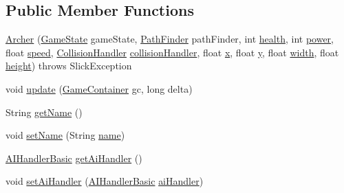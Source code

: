 \subsection*{Public Member Functions}
\begin{DoxyCompactItemize}
\item 
\mbox{\hyperlink{classentities_1_1_archer_a8f0807d8378f9f336f047ff9407df873}{Archer}} (\mbox{\hyperlink{classstates_1_1_game_state}{Game\+State}} game\+State, \mbox{\hyperlink{classentities_1_1_path_finder}{Path\+Finder}} path\+Finder, int \mbox{\hyperlink{classentities_1_1_subject_a8285660fdae3f0b220bbc686cf5c012c}{health}}, int \mbox{\hyperlink{classentities_1_1_subject_a7bd41d6fe9656de66d4a08c4a9565ec4}{power}}, float \mbox{\hyperlink{classentities_1_1_mobile_entity_a815a9d2b23a0bb7e3ee7739d4c10d7c3}{speed}}, \mbox{\hyperlink{classentities_1_1_collision_handler}{Collision\+Handler}} \mbox{\hyperlink{classentities_1_1_mobile_entity_a29fbe797671b1fc81eafe1e48fdc46f9}{collision\+Handler}}, float \mbox{\hyperlink{classorg_1_1newdawn_1_1slick_1_1geom_1_1_shape_a3e985bfff386c15a4efaad03d8ad60d3}{x}}, float \mbox{\hyperlink{classorg_1_1newdawn_1_1slick_1_1geom_1_1_shape_a9f934baded6a1b65ebb69e7e5f80ea00}{y}}, float \mbox{\hyperlink{classorg_1_1newdawn_1_1slick_1_1geom_1_1_rectangle_a967e1823f62daf45abb142779d1be62d}{width}}, float \mbox{\hyperlink{classorg_1_1newdawn_1_1slick_1_1geom_1_1_rectangle_a3bd010fdce636fc11ed0e0ad4d4b4a0a}{height}})  throws Slick\+Exception 
\item 
void \mbox{\hyperlink{classentities_1_1_archer_ae4fadcd75edae2e4c9631fa1fe9b813c}{update}} (\mbox{\hyperlink{classorg_1_1newdawn_1_1slick_1_1_game_container}{Game\+Container}} gc, long delta)
\item 
String \mbox{\hyperlink{classentities_1_1_archer_ad4d119c0a91628b0c5a1b4bdcf416ebb}{get\+Name}} ()
\item 
void \mbox{\hyperlink{classentities_1_1_archer_a19c73121003b6704a0d082a51757ea91}{set\+Name}} (String \mbox{\hyperlink{classentities_1_1_archer_a2c5680a0d628e5abbf69711d7df4d0b6}{name}})
\item 
\mbox{\hyperlink{classentities_1_1_a_i_handler_basic}{A\+I\+Handler\+Basic}} \mbox{\hyperlink{classentities_1_1_archer_ae85ccf8025d689f81fa292006792349a}{get\+Ai\+Handler}} ()
\item 
void \mbox{\hyperlink{classentities_1_1_archer_a65b384bc5292d266d21dde02efe77a77}{set\+Ai\+Handler}} (\mbox{\hyperlink{classentities_1_1_a_i_handler_basic}{A\+I\+Handler\+Basic}} \mbox{\hyperlink{classentities_1_1_archer_a362254fb1ca99f07804647033ffe26d1}{ai\+Handler}})
\end{DoxyCompactItemize}
